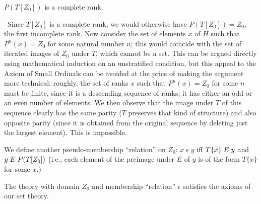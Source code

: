 \begin{lemme}
 $P(T[Z_0])$ is a complete rank.
\end{lemme}

\preuve\ Since $T[Z_0]$ is a complete rank, we would
  otherwise have $P(T[Z_0]) = Z_0$, the first incomplete rank.
  Now consider the set of elements $x$ of $H$ such that $P^n(x) =
  Z_0$ for some natural number $n$; this would coincide
  with the set 
  of iterated images of $Z_0$ under $T$, which cannot be a set.  This
  can be argued directly using mathematical
  induction on an 
  unstratified condition, but this appeal to the Axiom of
  Small Ordinals can be avoided at the price of
  making the argument more 
  technical: roughly, the set of ranks $x$ such that $P^n(x) = Z_0$
  for some $n$ must be finite, since it is a descending
  sequence of ranks; it has either an odd or an even number of
  elements.  We then observe that the image under $T$ of this sequence clearly
  has the same parity ($T$ preserves that kind of structure) and also opposite
  parity (since it is obtained from the original sequence by deleting just
  the largest element).  This is impossible.
\finpreuve

\begin{definition}
 We define another pseudo-membership ``relation'' on
 $Z_0$: $x \mathrel{\epsilon} y$ iff $T\{x\}\mathrel{E} y$ and $y\mathrel{E}
  P(T[Z_0])$ (i.e., each element of the preimage under $E$ of $y$
  is of the form $T\{x\}$ for some $x$.)
\end{definition}

\begin{thm}
 The theory with domain $Z_0$ and membership
 ``relation'' $\epsilon$ satisfies the axioms of our set theory.
\end{thm}

